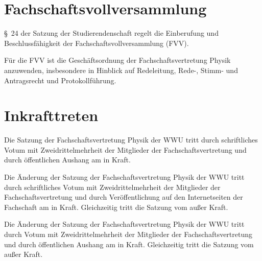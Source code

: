 \documentclass[
	a4paper,
	12pt,
	oneside,
	parskip=half-,
	pagesize,
	headsepline,
	german,
	ngerman
]{scrartcl}
\begin{document}
\section{Fachschaftsvollversammlung}
§~24 der Satzung der Studierendenschaft regelt die Einberufung und Beschlussfähigkeit der Fachschaftsvollversammlung (FVV).

Für die FVV ist die Geschäftsordnung der Fachschaftsvertretung Physik anzuwenden, insbesondere in Hinblick auf Redeleitung, Rede-, Stimm- und Antragsrecht und Protokollführung.

\section{Inkrafttreten}
Die Satzung der Fachschaftsvertretung Physik der WWU tritt durch schriftliches Votum mit Zweidrittelmehrheit der Mitglieder der Fachschaftsvertretung und durch öffentlichen Aushang am  in Kraft.

Die Änderung der Satzung der Fachschaftsvertretung Physik der WWU tritt durch schriftliches Votum mit Zweidrittelmehrheit der Mitglieder der Fachschaftsvertretung und durch Veröffentlichung auf den Internetseiten der Fachschaft am  in Kraft. Gleichzeitig tritt die Satzung vom  außer Kraft.

Die Änderung der Satzung der Fachschaftsvertretung Physik der WWU tritt durch Votum mit Zweidrittelmehrheit der Mitglieder der Fachschaftsvertretung und durch öffentlichen Aushang am  in Kraft. Gleichzeitig tritt die Satzung vom  außer Kraft.
\end{document}
